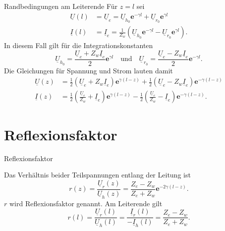 \documentclass{beamer}
\begin{document}
\begin{frame}{Randbedingungen am Leiterende}
Für $z=l$ sei
\begin{align*}
    \underline{U}(l) &= \underline{U}_{e} = \underline{U}_{h_{0}} \mathbf{e}^{- \gamma l}
    +
    \underline{U}_{r_{0}} \mathbf{e}^{ \gamma l} \\[1ex]
    \underline{I}(l) &= \underline{I}_{e} = \frac{1}{Z_{w}}
    \left(
    \underline{U}_{h_{0}} \mathbf{e}^{- \gamma l}
    -
    \underline{U}_{r_{0}} \mathbf{e}^{ \gamma l}
    \right).
\end{align*}
In diesem Fall gilt für die Integrationskonstanten
\[ \underline{U}_{h_{0}} = \frac{\underline{U}_{e} + Z_{w} \underline{I}_{e}}{2} \mathbf{e}^{\gamma l}
\quad \text{und} \quad
\underline{U}_{r_{0}} = \frac{\underline{U}_{e} - Z_{w} \underline{I}_{e}}{2} \mathbf{e}^{- \gamma l}. \]
Die Gleichungen für Spannung und Strom lauten damit
\begin{align}
    \underline{U}(z) &=
    \frac{1}{2} \left( \underline{U}_{e} + Z_{w} \underline{I}_{e} \right) \mathbf{e}^{\gamma (l - z)}
    +
    \frac{1}{2} \left( \underline{U}_{e} - Z_{w} \underline{I}_{e} \right) \mathbf{e}^{- \gamma (l - z)} \label{eq:UxE}
    \\[1ex]
    \underline{I}(z) &=
    \frac{1}{2} \left( \frac{\underline{U}_{e}}{Z_{w}} + \underline{I}_{e} \right) \mathbf{e}^{\gamma (l - z)}
    -
    \frac{1}{2} \left( \frac{\underline{U}_{e}}{Z_{w}} - \underline{I}_{e} \right) \mathbf{e}^{- \gamma (l - z)}
    \label{eq:IxE} .
\end{align}

\end{frame}


\section{Reflexionsfaktor}


\begin{frame}{Reflexionsfaktor}
\begin{figure}[!htb]
    \begin{center}
        
    \end{center}
\end{figure}

Das Verhältnis beider Teilspannungen entlang der Leitung ist
\[
r(z) = \frac{\underline{U}_{r}(z)}{\underline{U}_{h}(z)} =
       \frac{Z_{e}-Z_{w}}{Z_{e}+Z_{w}} \mathbf{e}^{-2 \gamma (l-z)}.
\]
$r$ wird Reflexionsfaktor genannt. Am Leiterende gilt
\begin{equation}
    r(l)
    = \frac{\underline{U}_{r}(l)}{\underline{U}_{h}(l)}
    = \frac{\underline{I}_{r}(l)}{- \underline{I}_{h}(l)}
    = \frac{Z_{e}-Z_{w}}{Z_{e}+Z_{w}} \label{eq:RFactor}.
\end{equation}

\end{frame}
\end{document}
